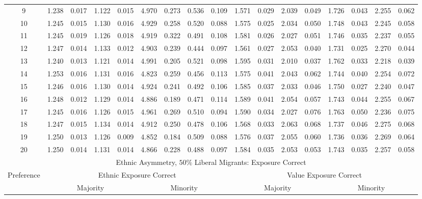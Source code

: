 \documentclass{article}
\begin{document}
\begin{table}[H]
{\begin{tabular}{|c|c|c|c|c|c|c|c|c|c|c|c|c|c|c|c|c|}
     9 & 1.238 & 0.017 & 1.122 & 0.015 & 4.970 & 0.273 & 0.536 & 0.109 & 1.571 & 0.029 & 2.039 & 0.049 & 1.726 & 0.043 & 2.255 & 0.062 \\ 
    10 & 1.245 & 0.015 & 1.130 & 0.016 & 4.929 & 0.258 & 0.520 & 0.088 & 1.575 & 0.025 & 2.034 & 0.050 & 1.748 & 0.043 & 2.245 & 0.058 \\ 
    11 & 1.245 & 0.019 & 1.126 & 0.018 & 4.919 & 0.322 & 0.491 & 0.108 & 1.581 & 0.026 & 2.027 & 0.051 & 1.746 & 0.035 & 2.237 & 0.055 \\ 
    12 & 1.247 & 0.014 & 1.133 & 0.012 & 4.903 & 0.239 & 0.444 & 0.097 & 1.561 & 0.027 & 2.053 & 0.040 & 1.731 & 0.025 & 2.270 & 0.044 \\ 
    13 & 1.240 & 0.013 & 1.121 & 0.014 & 4.991 & 0.205 & 0.521 & 0.098 & 1.595 & 0.031 & 2.010 & 0.037 & 1.762 & 0.033 & 2.218 & 0.039 \\ 
    14 & 1.253 & 0.016 & 1.131 & 0.016 & 4.823 & 0.259 & 0.456 & 0.113 & 1.575 & 0.041 & 2.043 & 0.062 & 1.744 & 0.040 & 2.254 & 0.072 \\ 
    15 & 1.246 & 0.016 & 1.130 & 0.014 & 4.924 & 0.241 & 0.492 & 0.106 & 1.585 & 0.037 & 2.033 & 0.046 & 1.750 & 0.027 & 2.240 & 0.047 \\ 
    16 & 1.248 & 0.012 & 1.129 & 0.014 & 4.886 & 0.189 & 0.471 & 0.114 & 1.589 & 0.041 & 2.054 & 0.057 & 1.743 & 0.044 & 2.255 & 0.067 \\ 
    17 & 1.245 & 0.016 & 1.126 & 0.015 & 4.961 & 0.269 & 0.510 & 0.094 & 1.590 & 0.034 & 2.027 & 0.076 & 1.763 & 0.050 & 2.236 & 0.075 \\ 
    18 & 1.247 & 0.015 & 1.134 & 0.014 & 4.912 & 0.250 & 0.478 & 0.106 & 1.568 & 0.033 & 2.063 & 0.068 & 1.737 & 0.046 & 2.275 & 0.068 \\ 
    19 & 1.250 & 0.013 & 1.126 & 0.009 & 4.852 & 0.184 & 0.509 & 0.088 & 1.576 & 0.037 & 2.055 & 0.060 & 1.736 & 0.036 & 2.269 & 0.064 \\ 
    20 & 1.250 & 0.014 & 1.131 & 0.014 & 4.866 & 0.228 & 0.488 & 0.097 & 1.584 & 0.035 & 2.053 & 0.053 & 1.743 & 0.035 & 2.257 & 0.058 \\ 
      \hline
  \multicolumn{17}{|c|}{Ethnic Asymmetry, $50 \%$ Liberal Migrants: Exposure Correct}  \\\hline
 Preference &  \multicolumn{8}{|c|}{Ethnic Exposure Correct} & \multicolumn{8}{|c|}{Value Exposure Correct}   \\\hline
 & \multicolumn{4}{|c|}{Majority} & \multicolumn{4}{|c|}{Minority}  & \multicolumn{4}{|c|}{Majority} & \multicolumn{4}{|c|}{Minority}  \\

\end{tabular}}
\end{table}
\end{document}
